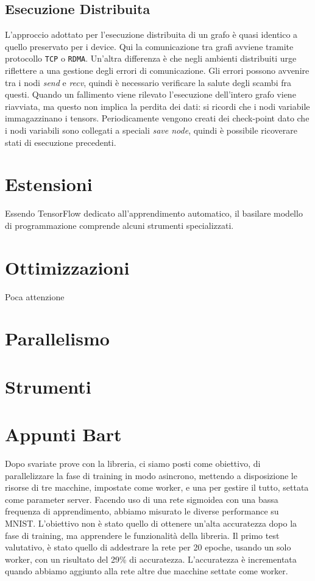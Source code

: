 \documentclass[DIV=calc, paper=a4, fontsize=11pt]{scrartcl}	 %
\begin{document}
\begin{multicols}{2}
			\subsection{Esecuzione Distribuita}
				L'approccio adottato per l'esecuzione distribuita di un grafo è quasi identico a quello preservato per i device. Qui la comunicazione tra grafi avviene tramite protocollo \texttt{TCP} o \texttt{RDMA}. Un'altra differenza è che negli ambienti distribuiti urge riflettere a una gestione degli errori di comunicazione. Gli errori possono avvenire tra i nodi \textit{send} e \textit{recv}, quindi è necessario verificare la salute degli scambi fra questi. Quando un fallimento viene rilevato l'esecuzione dell'intero grafo viene riavviata, ma questo non implica la perdita dei dati: si ricordi che i nodi variabile immagazzinano i tensors. Periodicamente vengono creati dei check-point dato che i nodi variabili sono collegati a speciali \textit{save node}, quindi è possibile ricoverare stati di esecuzione precedenti.
		\section{Estensioni}
			Essendo TensorFlow dedicato all'apprendimento automatico, il basilare modello di programmazione comprende alcuni strumenti specializzati. 
			
		\section{Ottimizzazioni}
			Poca attenzione
			
		\section{Parallelismo}
		
		\section{Strumenti}
		
		\section{Appunti Bart}		
		Dopo svariate prove con la libreria, ci siamo posti come obiettivo, di parallelizzare la fase di training in modo asincrono, mettendo a disposizione le risorse di tre macchine, impostate come worker, e una per gestire il tutto, settata come parameter server. Facendo uso di una rete sigmoidea con una bassa frequenza di apprendimento, abbiamo misurato le diverse performance su MNIST. L'obiettivo non è stato quello di ottenere un'alta accuratezza dopo la fase di training, ma apprendere le funzionalità della libreria.
		Il primo test valutativo, è stato quello di addestrare la rete per 20 epoche, usando un solo worker, con un risultato del 29\% di accuratezza. L'accuratezza è incrementata quando abbiamo aggiunto alla rete altre due macchine settate come worker.

\end{multicols}
\end{document}
